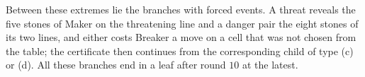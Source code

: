 Between these extremes lie the branches with forced events. A threat reveals the five stones of Maker on the
threatening line and a danger pair the eight stones of its two lines, and either costs Breaker a move on a
cell that was not chosen from the table; the certificate then continues from the corresponding child of type (c) or (d).
All these branches end in a leaf after round $10$ at the latest.
